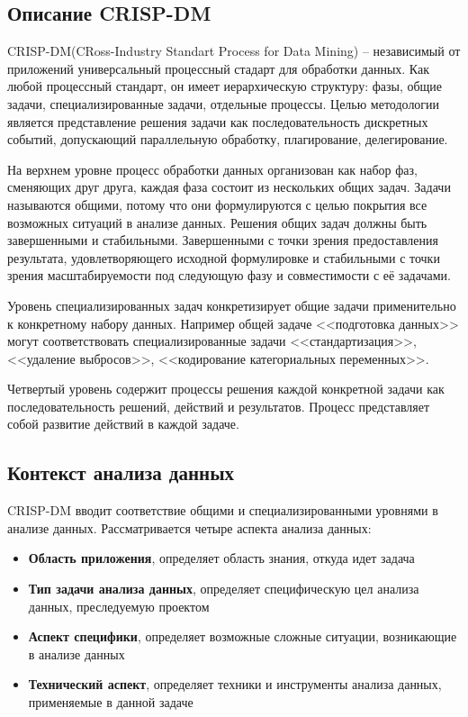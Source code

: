 \subsection{Описание CRISP-DM}
CRISP-DM(CRoss-Industry Standart Process for Data Mining) -- независимый от приложений универсальный процессный стадарт для обработки данных. Как любой процессный стандарт, он имеет иерархическую структуру: фазы, общие задачи, специализированные задачи, отдельные процессы. Целью методологии является представление решения задачи как последовательность дискретных событий, допускающий параллельную обработку, плагирование, делегирование. 

На верхнем уровне процесс обработки данных организован как набор фаз, сменяющих друг друга, каждая фаза состоит из нескольких общих задач. Задачи называются общими, потому что они формулируются с целью покрытия все возможных ситуаций в анализе данных. Решения общих задач должны быть завершенными и стабильными. Завершенными с точки зрения предоставления результата, удовлетворяющего исходной формулировке и стабильными с точки зрения масштабируемости под следующую фазу и совместимости с её задачами.

Уровень специализированных задач конкретизирует общие задачи применительно к конкретному набору данных. Например общей задаче <<подготовка данных>> могут соответствовать специализированные задачи <<стандартизация>>, <<удаление выбросов>>, <<кодирование категориальных переменных>>.

Четвертый уровень содержит процессы решения каждой конкретной задачи как последовательность решений, действий и результатов. Процесс представляет собой развитие действий в каждой задаче.

\subsection{Контекст анализа данных}
CRISP-DM вводит соответствие общими и специализированными уровнями в анализе данных. Рассматривается четыре аспекта анализа данных:
\begin{itemize}
	\item \textbf{Область приложения}, определяет область знания, откуда идет задача
	\item \textbf{Тип задачи анализа данных}, определяет специфическую цел анализа данных, преследуемую проектом
	\item \textbf{Аспект специфики}, определяет возможные сложные ситуации, возникающие в анализе данных
	\item \textbf{Технический аспект}, определяет техники и инструменты анализа данных, применяемые в данной задаче 
\end{itemize}

